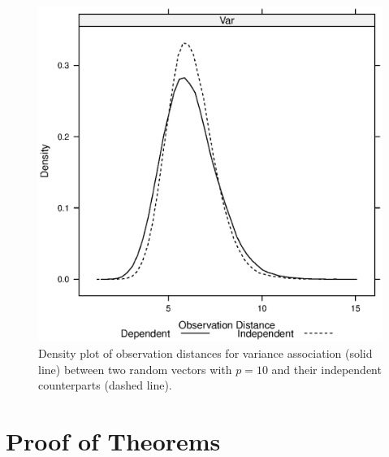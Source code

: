 \documentclass{sig-alternate}
\begin{document}
\begin{figure}
  \centering
  \includegraphics[width=.25\textwidth,height=.25\textwidth]{../code/visualize/plot/distance-dist.eps}
  \caption{Density plot of observation distances for variance
    association (solid line) between two random vectors with $p=10$
    and their independent counterparts (dashed line).}
  \label{fig:discussion-distance-distribution}
\end{figure}


\appendix{}

\section{Proof of Theorems}
\label{sec:proof}
\end{document}
